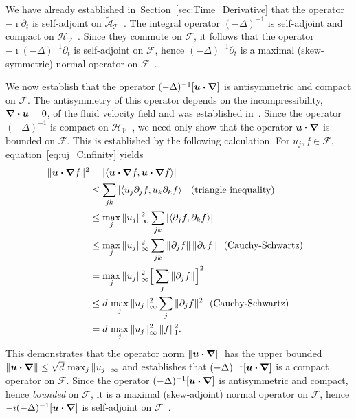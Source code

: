 \documentclass[leqno,onefignum,onetabnum]{siamltex1213}
\newcommand{\secref}[1]{Section~\ref{#1}}
\newcommand{\Tc}{\mathcal{T}}
\newcommand{\Vc}{\mathcal{V}}
\newcommand{\Hs}{\mathscr{H}}
\newcommand{\As}{\mathscr{A}}
\newcommand{\Fs}{\mathscr{F}}
\newcommand\bnabla{\mbox{\boldmath${\nabla}$}}
\providecommand\bcdot{\boldsymbol{\cdot}}
\newcommand{\vecu}{\boldsymbol{u}}
\begin{document}
We have already established in~\secref{sec:Time_Derivative} that the
operator $-\imath\partial_t$ is self-adjoint on
$\tilde{\As}_{\Tc}$~\cite{Stone:64}. The integral operator $(-\Delta)^{-1}$
is self-adjoint and compact on
$\Hs_{\Vc}$~\cite{Stakgold:BVP:2000}. Since they commute on $\Fs$, it  
follows that the operator $-\imath(-\Delta)^{-1}\partial_{t}$ is self-adjoint on $\Fs$,
hence $(-\Delta)^{-1}\partial_{t}$ is a maximal (skew-symmetric) normal operator
on $\Fs$~\cite{Stone:64}.


We now establish that the operator $(-\Delta)^{-1}[\vecu\bcdot\bnabla]$
is antisymmetric and compact on $\Fs$. The antisymmetry of this
operator depends on the incompressibility, $\bnabla\bcdot\vecu=0$, of
the fluid velocity field and was established
in~\cite{Bhattacharya:AAP:1999:951,Pavliotis:PHD_Thesis}. 
Since the operator $(-\Delta)^{-1}$ is
compact on $\Hs_{\Vc}$~\cite{Stakgold:BVP:2000}, we need only show
that the operator $\vecu\bcdot\bnabla$ is bounded on $\Fs$. This is
established by the following calculation. For $u_j,f\in\Fs$,
equation~\eqref{eq:uj_Cinfinity}  yields
%
\begin{align}\label{eq:Second_Bound_A}
  \|\vecu\bcdot\bnabla f\|^2&=|\langle\vecu\bcdot\bnabla f,\vecu\bcdot\bnabla f\rangle| 
         \\
         &\leq\sum_{jk}|\langle u_j\partial_jf,u_k\partial_kf\rangle |~\text{ (triangle inequality) }
         \notag\\
         &\leq\max_j\|u_j\|_\infty^2\sum_{jk}|\langle\partial_jf,\partial_kf\rangle|
         \notag\\
         &\leq\max_j\|u_j\|_\infty^2\sum_{jk}\|\partial_jf\|\,\|\partial_kf\|
              ~\text{ (Cauchy-Schwartz) }~
         \notag\\
         &=\max_j\|u_j\|_\infty^2\Big[\sum_{j}\|\partial_jf\|\Big]^2
         \notag\\
         &\leq d\,\max_j\|u_j\|_\infty^2\sum_{j}\|\partial_jf\|^2
         ~\text{ (Cauchy-Schwartz) }~
         \notag\\
         &=d\,\max_j\|u_j\|_\infty^2\,\|f\|_1^2.
         \notag
\end{align}
%
This demonstrates that the operator norm $\|\vecu\bcdot\bnabla\|$ has
the upper bounded $\|\vecu\bcdot\bnabla\|\leq\sqrt{d}\,\max_j\|u_j\|_\infty$ and
establishes that $(-\Delta)^{-1}[\vecu\bcdot\bnabla]$ is a compact operator
on $\Fs$. Since the operator $(-\Delta)^{-1}[\vecu\bcdot\bnabla]$ is
antisymmetric and compact, hence \emph{bounded} on $\Fs$, it is a maximal (skew-adjoint)
normal operator on $\Fs$, hence $-\imath(-\Delta)^{-1}[\vecu\bcdot\bnabla]$ is
self-adjoint on $\Fs$~\cite{Stone:64}.
\end{document}
